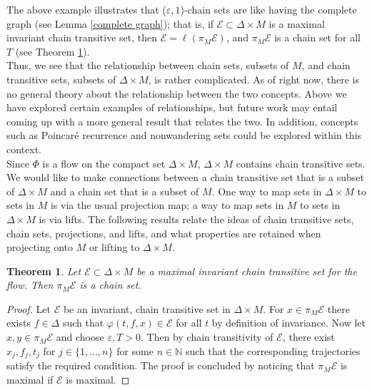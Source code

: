 \documentclass[11pt]{article}
\newtheorem{thm}{Theorem}
\begin{document}
The above example illustrates that ($\varepsilon,1$)-chain sets are like having the complete graph (see Lemma \ref{complete graph}); that is, if $\mathcal{E}\subset \Delta\times M$ is a maximal invariant chain transitive set, then $\mathcal{E}=\ell(\pi_M\mathcal{E})$, and $\pi_M\mathcal{E}$ is a chain set for all $T$ (see Theorem \ref{max chain set}).\\
\indent Thus, we see that the relationship between chain sets, subsets of $M$, and chain transitive sets, subsets of $\Delta\times M$, is rather complicated. As of right now, there is no general theory about the relationship between the two concepts.  Above we have explored certain examples of relationships, but future work may entail coming up with a more general result that relates the two.  In addition, concepts such as Poincar\'e recurrence and nonwandering sets could be explored within this context.  \\

Since $\Phi$ is a flow on the compact set $\Delta\times M$, $\Delta\times M$ contains chain transitive sets.  We would like to make connections between a chain transitive set that is a subset of $\Delta\times M$ and a chain set that is a subset of $M$.  One way to map sets in $\Delta\times M$ to sets in $M$ is via the usual projection map; a way to map sets in $M$ to sets in $\Delta\times M$ is via lifts.  The following results relate the ideas of chain transitive sets, chain sets, projections, and lifts, and what properties are retained when projecting onto $M$ or lifting to $\Delta\times M$. 


\begin{thm}\label{max chain set}
Let $\mathcal{E}\subset \Delta\times M$ be a maximal invariant chain transitive set for the flow.  Then $\pi_M\mathcal{E}$ is a chain set.
\end{thm}
\begin{proof}
Let $\mathcal{E}$ be an invariant, chain transitive set in $\Delta\times M$.  For $x\in\pi_M\mathcal{E}$ there exists $f\in\Delta$ such that $\varphi(t,f,x)\in\mathcal{E}$ for all $t$ by definition of invariance.  Now let $x,y\in \pi_M\mathcal{E}$ and choose $\varepsilon, T>0$.  Then by chain transitivity of $\mathcal{E}$, there exist $x_j, f_j, t_j$ for $j\in\{1,\ldots,n\}$ for some $n\in\mathbb{N}$ such that the corresponding trajectories satisfy the required condition.  The proof is concluded by noticing that $\pi_M\mathcal{E}$ is maximal if $\mathcal{E}$ is maximal.

\end{proof}
\end{document}
